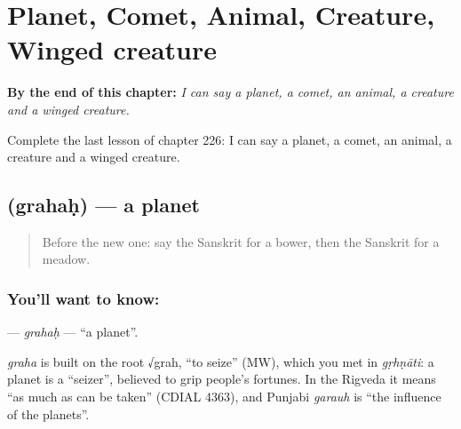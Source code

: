 
\chapter{Planet, Comet, Animal, Creature, Winged creature}
\label{ch:sa-planet-comet-animal-creature-winged-creature}

\begin{chapteropening}
\textbf{By the end of this chapter:} \emph{I can say a planet, a comet, an animal, a creature and a winged creature.}

Complete the last lesson of chapter 226: I can say a planet, a comet, an animal, a creature and a winged creature.
\end{chapteropening}

\section[\texorpdfstring{\sk{ग्रहः} (grahaḥ)}{ग्रहः (grahaḥ)}]{ (grahaḥ) — a planet}

\label{lesson:SA-C226-grahah}



\begin{quote}
Before the new one: say the Sanskrit for a bower, then the Sanskrit for a meadow.
\end{quote}

\subsection*{You'll want to know: }
\textbf{} — \emph{grahaḥ} — \textquotedblleft{}a planet\textquotedblright{}.

\begin{cousinweb}
\emph{graha} is built on the root √grah, \textquotedblleft{}to seize\textquotedblright{} (MW), which you met in \emph{gṛhṇāti}: a planet is a \textquotedblleft{}seizer\textquotedblright{}, believed to grip people's fortunes. In the Rigveda it means \textquotedblleft{}as much as can be taken\textquotedblright{} (CDIAL 4363), and Punjabi \emph{garauh} is \textquotedblleft{}the influence of the planets\textquotedblright{}.
\end{cousinweb}


